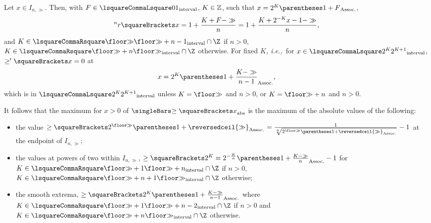 \documentclass[10pt, a4paper, twoside]{basestyle}
\newcommand{\idest}{\emph{, i.e.,\ }}
\newcommand{\ApproximateRoot}[1]{{{}^{#1}r}}
\newcommand\ModOne[1]{\reversedceil{#1}}
\begin{document}
Let $x\in I_{n,\gg}$.
Then, with $F\in\intclop 0 1$, $K\in\mathbb{Z}$, such that $x=2^K\pa{1+F}$,
\[
\ApproximateRoot{n}\of{x} = 1+\frac{K+F-\gg}{n} = 1+\frac{K+2^{-K}x-1-\gg}{n}\text,
\]
and $K\in \intclos{\Floor{\gg}}{\Floor{\gg}+n-1}\Intersection\Z$ if $n>0$,
$K\in \intclos{\Floor{\gg}+n}{\Floor{\gg}}\Intersection\Z$ otherwise.
For fixed $K$\idest for $x\in\intclop{2^K}{2^{K+1}}$,
$\ge\der\of{x}=0$ at \[
x=2^K\pa{1+\frac{K-\gg}{n-1}}\text,
\]
which is in $\intclop{2^K}{2^{K+1}}$ unless $K=\Floor{\gg}$ and $n>0$, or $K=\Floor{\gg}+n$ and $n>0$.

It follows that the maximum for $x>0$ of $\abs{\ge\of{x}}$ is the maximum of the absolute values of the
following:
\begin{itemize}
\item the value $\ge\of{2^{\Floor{\gg}}\pa{1+\ModOne{\gg}}}=
\frac{1}{\sqrt[n]{2^{\Floor{\gg}}\pa{1+\ModOne{\gg}}}}-1$ at the endpoint of $I_{n,\gg}$;
\item the values at powers of two within $I_{n,\gg}$,
$\ge\of{2^K}=2^{-\frac{K}{n}}\pa{1+\frac{K-\gg}{n}}-1$ for
$K\in \intclos{\Floor{\gg}+1}{\Floor{\gg}+n}\Intersection\Z$ if $n>0$,
$K\in \intclos{\Floor{\gg}+n+1}{\Floor{\gg}}\Intersection\Z$ otherwise;
\item the smooth extrema, $\ge\of{2^K\pa{1+\frac{K-\gg}{n-1}}}$ where
$K\in \intclos{\Floor{\gg}+1}{\Floor{\gg}+n-2}\Intersection\Z$ if $n>0$ and
$K\in \intclos{\Floor{\gg}+n}{\Floor{\gg}}\Intersection\Z$ otherwise.
\end{itemize}
\end{document}
